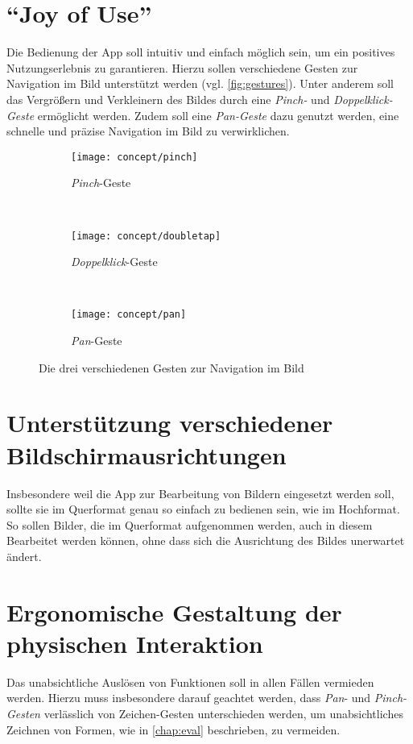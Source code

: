 \section{``Joy of Use''}
Die Bedienung der App soll intuitiv und einfach möglich sein, um ein positives Nutzungserlebnis zu garantieren.
Hierzu sollen verschiedene Gesten zur Navigation im Bild unterstützt werden (vgl. \autoref{fig:gestures}).
Unter anderem soll das Vergrößern und Verkleinern des Bildes durch eine \emph{Pinch-} und \emph{Doppelklick-Geste} ermöglicht werden.
Zudem soll eine \emph{Pan-Geste} dazu genutzt werden, eine schnelle und präzise Navigation im Bild zu verwirklichen.
\begin{figure}[h]
	\begin{subfigure}[t]{0.3\textwidth}
		\centering
		\texttt{[image: concept/pinch]}
		\caption{\emph{Pinch}-Geste}
	\end{subfigure}
	~
	\begin{subfigure}[t]{0.3\textwidth}
		\centering
		\texttt{[image: concept/doubletap]}
		\caption{\emph{Doppelklick}-Geste}
	\end{subfigure}
	~
	\begin{subfigure}[t]{0.3\textwidth}
		\centering
		\texttt{[image: concept/pan]}
		\caption{\emph{Pan}-Geste}
	\end{subfigure}
	\centering
	\caption{Die drei verschiedenen Gesten zur Navigation im Bild}
	\label{fig:gestures}
\end{figure}

\section{Unterstützung verschiedener Bildschirmausrichtungen}
Insbesondere weil die App zur Bearbeitung von Bildern eingesetzt werden soll, sollte sie im Querformat genau so einfach zu bedienen sein, wie im Hochformat.
So sollen Bilder, die im Querformat aufgenommen werden, auch in diesem Bearbeitet werden können, ohne dass sich die Ausrichtung des Bildes unerwartet ändert.

\section{Ergonomische Gestaltung der physischen Interaktion}
Das unabsichtliche Auslösen von Funktionen soll in allen Fällen vermieden werden.
Hierzu muss insbesondere darauf geachtet werden, dass \emph{Pan}- und \emph{Pinch-Gesten} verlässlich von Zeichen-Gesten unterschieden werden, um unabsichtliches Zeichnen von Formen, wie in \autoref{chap:eval} beschrieben, zu vermeiden.

